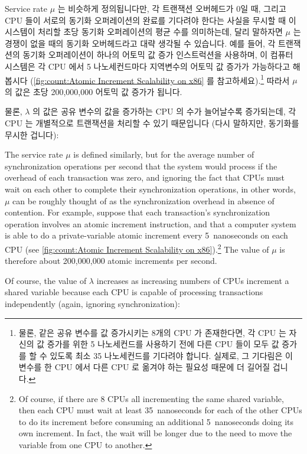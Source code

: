 \fi

Service rate $\mu$ 는 비슷하게 정의됩니다만, 각 트랜잭션 오버헤드가 0일 때,
그리고 CPU 들이 서로의 동기화 오퍼레이션의 완료를 기다려야 한다는 사실을 무시할
때 이 시스템이 처리할 초당 동기화 오퍼레이션의 평균 수를 의미하는데, 달리
말하자면 $\mu$ 는 경쟁이 없을 때의 동기화 오버헤드라고 대략 생각될 수 있습니다.
예를 들어, 각 트랜잭션의 동기화 오퍼레이션이 하나의 어토믹 값 증가 인스트럭션을
사용하며, 이 컴퓨터 시스템은 각 CPU 에서 5 나노세컨드마다 지역변수의 어토믹 값
증가가 가능하다고 해 봅시다 (\cref{fig:count:Atomic Increment Scalability on
x86} 를 참고하세요).\footnote{
	물론, 같은 공유 변수를 값 증가시키는 8개의 CPU 가 존재한다면, 각 CPU 는
	자신의 값 증가를 위한 5 나노세컨드를 사용하기 전에 다른 CPU 들이 모두
	값 증가를 할 수 있도록 최소 35 나노세컨드를 기다려야 합니다.
	실제로, 그 기다림은 이 변수를 한 CPU 에서 다른 CPU 로 옮겨야 하는
	필요성 때문에 더 길어질 겁니다.}
따라서 $\mu$ 의 값은 초당 200,000,000 어토믹 값 증가가 됩니다.

물론, $\lambda$ 의 값은 공유 변수의 값을 증가하는 CPU 의 수가 늘어날수록
증가되는데, 각 CPU 는 개별적으로 트랜잭션을 처리할 수 있기 때문입니다 (다시
말하지만, 동기화를 무시한 겁니다):

\iffalse

The service rate $\mu$ is defined similarly, but for the average
number of synchronization operations per second that the system
would process if the overhead of each transaction was zero, and
ignoring the fact that CPUs must wait on each other to complete
their synchronization operations, in other words, $\mu$ can be roughly
thought of as the synchronization overhead in absence of contention.
For example, suppose that each transaction's synchronization operation
involves an atomic increment instruction, and that a computer system is
able to do a private-variable atomic increment every 5~nanoseconds on
each CPU
(see \cref{fig:count:Atomic Increment Scalability on x86}).\footnote{
	Of course, if there are 8 CPUs all incrementing the same
	shared variable, then each CPU must wait at least 35~nanoseconds
	for each of the other CPUs to do its increment before consuming
	an additional 5~nanoseconds doing its own increment.
	In fact, the wait will be longer due to the need
	to move the variable from one CPU to another.}
The value of $\mu$ is therefore about 200,000,000 atomic increments
per second.

Of course, the value of $\lambda$ increases as increasing numbers of CPUs
increment a shared variable because each CPU is capable of processing
transactions independently (again, ignoring synchronization):

